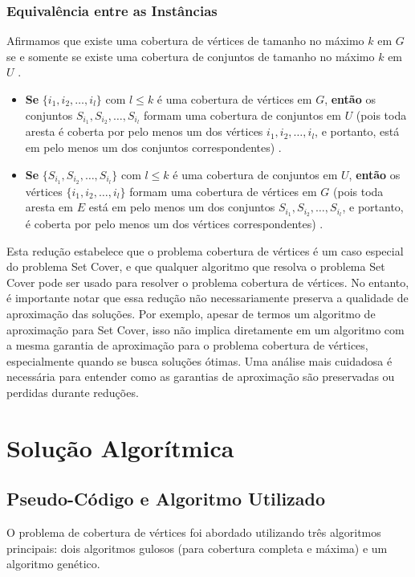 \documentclass[12pt, a4paper]{report}
\begin{document}
\subsection*{Equivalência entre as Instâncias}
Afirmamos que existe uma cobertura de vértices de tamanho no máximo \(k\) em \(G\) se e somente se existe uma cobertura de conjuntos de tamanho no máximo \(k\) em \(U\) 
\cite{kleinberg2006algorithm}.
\begin{itemize}
    \item \textbf{Se} \( \{i_1, i_2, \dots, i_l\} \) com \(l \leq k\) é uma cobertura de vértices em \(G\), \textbf{então} os conjuntos \(S_{i_1}, S_{i_2}, \dots, S_{i_l}\) formam uma cobertura de conjuntos em \(U\) (pois toda aresta é coberta por pelo menos um dos vértices \(i_1, i_2, \dots, i_l\), e portanto, está em pelo menos um dos conjuntos correspondentes) 
    \cite{kleinberg2006algorithm}.
    \item \textbf{Se} \( \{S_{i_1}, S_{i_2}, \dots, S_{i_l}\} \) com \(l \leq k\) é uma cobertura de conjuntos em \(U\), \textbf{então} os vértices \( \{i_1, i_2, \dots, i_l\} \) formam uma cobertura de vértices em \(G\) (pois toda aresta em \(E\) está em pelo menos um dos conjuntos \(S_{i_1}, S_{i_2}, \dots, S_{i_l}\), e portanto, é coberta por pelo menos um dos vértices correspondentes) 
    \cite{kleinberg2006algorithm}.
\end{itemize}

Esta redução estabelece que o problema cobertura de vértices é um caso especial do problema Set Cover, e que qualquer algoritmo que resolva o problema Set Cover pode ser usado para resolver o problema cobertura de vértices. No entanto, é importante notar que essa redução não necessariamente preserva a qualidade de aproximação das soluções. Por exemplo, apesar de termos um algoritmo de aproximação para Set Cover, isso não implica diretamente em um algoritmo com a mesma garantia de aproximação para o problema cobertura de vértices, especialmente quando se busca soluções ótimas. Uma análise mais cuidadosa é necessária para entender como as garantias de aproximação são preservadas ou perdidas durante reduções. \cite{kleinberg2006algorithm}

\chapter{Solução Algorítmica}

\section{Pseudo-Código e Algoritmo Utilizado}
O problema de cobertura de vértices foi abordado utilizando três algoritmos principais: dois algoritmos gulosos (para cobertura completa e máxima) e um algoritmo genético. 
\end{document}
